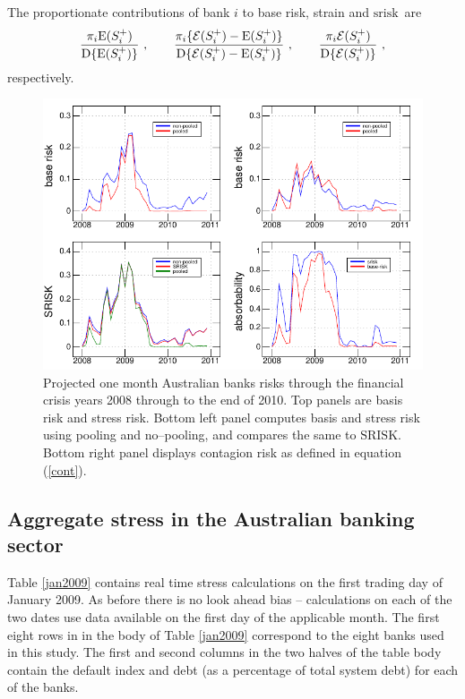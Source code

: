 \documentclass[authoryear]{elsarticle}
\newcommand{\E}{\mathrm{E}}
\newcommand{\Ex}{{\cal E}}
\newcommand{\SR}{\ensuremath{\mathrm{SRISK}}}
\newcommand{\sr}{\ensuremath{\mathrm{srisk}}}
\newcommand{\eref}[1]{(\ref{#1})}
\newcommand{\tref}[1]{Table \ref{#1}}
\newcommand{\cq}{\ , \qquad}
\newcommand{\be}[1]{\begin{equation}\label{#1}}
\newcommand{\ee}{\end{equation}}
\newcommand{\D}{\mathrm{D}}
\begin{document}
The proportionate contributions of bank $i$ to base risk, strain and \sr\ are 
\be{contrib}
\frac{\pi_i\E(S_i^+)}{\D\{\E(S_i^+)\}}\cq \frac{\pi_i\{\Ex(S_i^+)-\E(S_i^+)\}}{\D\{\Ex(S_i^+)-\E(S_i^+)\}}\cq \frac{\pi_i\Ex(S_i^+)}{\D\{\Ex(S_i^+)\}}\ ,
\ee
respectively. 

\begin{figure}[htbp]
\begin{center}
\includegraphics[width=12cm]{figures/fig6.pdf}
\caption{Projected one month  Australian banks risks through the financial crisis years 2008 through to the end of 2010.  Top panels are basis risk and stress risk.  Bottom left panel computes  basis and stress risk using pooling and no--pooling, and compares the same to \SR.   Bottom right panel displays contagion risk as defined in equation \eref{cont}.}
\label{fig6}
\end{center}
\end{figure}






\subsection{Aggregate stress in the Australian banking sector}\label{monitoring}
 \tref{jan2009} contains real time stress calculations on the first trading day of  January 2009.  As before there is no look ahead bias -- calculations on each of the two dates use data available on the first day of the applicable month.   The first eight rows in in the body of \tref{jan2009} correspond to the eight banks used in this study.  The first  and second columns in the two halves of the table body contain the default index  and debt  (as a percentage of total system debt) for each of the banks. 
\end{document}
